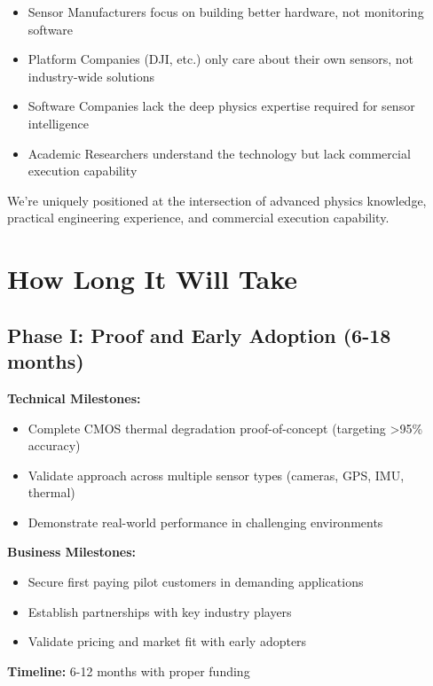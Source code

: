\documentclass[11pt,letterpaper]{article}
\begin{document}
\begin{itemize}[leftmargin=10pt, itemsep=1pt]
    \item Sensor Manufacturers focus on building better hardware, not monitoring software
    \item Platform Companies (DJI, etc.) only care about their own sensors, not industry-wide solutions
    \item Software Companies lack the deep physics expertise required for sensor intelligence
    \item Academic Researchers understand the technology but lack commercial execution capability
\end{itemize}

We're uniquely positioned at the intersection of advanced physics knowledge, practical engineering experience, and commercial execution capability.

\section*{How Long It Will Take}

\subsection*{Phase I: Proof and Early Adoption (6-18 months)}

\textbf{Technical Milestones:}
\begin{itemize}[leftmargin=10pt, itemsep=1pt]
    \item Complete CMOS thermal degradation proof-of-concept (targeting >95\% accuracy)
    \item Validate approach across multiple sensor types (cameras, GPS, IMU, thermal)
    \item Demonstrate real-world performance in challenging environments
\end{itemize}

\textbf{Business Milestones:}
\begin{itemize}[leftmargin=10pt, itemsep=1pt]
    \item Secure first paying pilot customers in demanding applications
    \item Establish partnerships with key industry players
    \item Validate pricing and market fit with early adopters
\end{itemize}

\textbf{Timeline:} 6-12 months with proper funding
\end{document}
